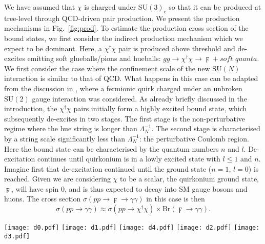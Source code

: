 We have assumed that $\chi$ is charged under $\mathrm{SU}(3)_{c}$ so that it can
be produced at tree-level through QCD-driven pair production. We present the
production mechanisms in Fig.~\ref{fig:prod}. To estimate the production cross
section of the bound states, we first consider the indirect production mechanism
which we expect to be dominant. Here, a $\chi^\dagger \chi$ pair is produced
above threshold and de-excites emitting soft glueballs/pions and hueballs:
$gg \rightarrow \chi^\dagger \chi \rightarrow \digamma + \textit{soft quanta}$. We
first consider the case where the confinement scale of the new $\mathrm{SU}(N)$
interaction is similar to that of QCD. What happens in this case can be adapted
from the discussion in \cite{Carlson:1991zn}, where a fermionic quirk charged
under an unbroken $\mathrm{SU}(2)$ gauge interaction was considered. As already
briefly discussed in the introduction, the $\chi^\dagger \chi$ pairs initially
form a highly excited bound state, which subsequently de-excites in two stages.
The first stage is the non-perturbative regime where the hue string is longer
than $\Lambda_{N}^{-1}$. The second stage is characterised by a string scale
significantly less than $\Lambda_{N}^{-1}$: the perturbative Coulomb region.
Here the bound state can be characterised by the quantum numbers $n$ and $l$.
De-excitation continues until quirkonium is in a lowly excited state with
$l \leq 1$ and $n$. Imagine first that de-excitation continued until the ground
state ($n=1$, $l=0$) is reached. Given we are considering $\chi$ to be a scalar,
the quirkonium ground state, $\digamma$, will have spin 0, and is thus expected to
decay into SM gauge bosons and huons. The cross section
$\sigma(pp \rightarrow \digamma \rightarrow \gamma \gamma)$ in this case is then
\begin{equation}
  \sigma (pp \rightarrow \gamma \gamma) \approx \sigma(pp \rightarrow \chi^\dagger
  \chi) \times \text{Br}(\digamma \rightarrow \gamma \gamma).
\end{equation}
\begin{figure*}[t]
  \centering
  \texttt{[image: d0.pdf]}
  \texttt{[image: d1.pdf]}
  \texttt{[image: d4.pdf]}
  \texttt{[image: d2.pdf]}
  \texttt{[image: d3.pdf]}
  \caption{Tree-level pair production mechanisms for the scalar quirk $\chi$.}
  \label{fig:prod}
\end{figure*}

